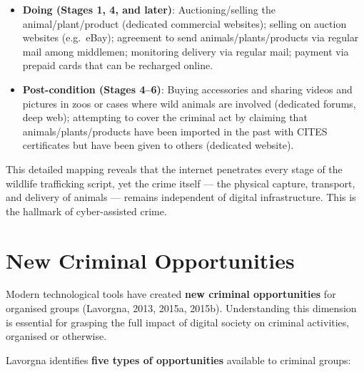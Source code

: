 \documentclass[11pt,a4paper,openany]{report}
\theoremstyle{definition}
\theoremstyle{plain}
\theoremstyle{remark}
\begin{document}
\begin{itemize}
    \item \textbf{Doing (Stages 1, 4, and later)}: Auctioning/selling the animal/plant/product (dedicated commercial websites); selling on auction websites (e.g.\ eBay); agreement to send animals/plants/products via regular mail among middlemen; monitoring delivery via regular mail; payment via prepaid cards that can be recharged online.
    \item \textbf{Post-condition (Stages 4--6)}: Buying accessories and sharing videos and pictures in zoos or cases where wild animals are involved (dedicated forums, deep web); attempting to cover the criminal act by claiming that animals/plants/products have been imported in the past with CITES certificates but have been given to others (dedicated website).
\end{itemize}

This detailed mapping reveals that the internet penetrates every stage of the wildlife trafficking script, yet the crime itself --- the physical capture, transport, and delivery of animals --- remains independent of digital infrastructure. This is the hallmark of cyber-assisted crime.


\section{New Criminal Opportunities}

Modern technological tools have created \textbf{new criminal opportunities} for organised groups (Lavorgna, 2013, 2015a, 2015b). Understanding this dimension is essential for grasping the full impact of digital society on criminal activities, organised or otherwise.

Lavorgna identifies \textbf{five types of opportunities} available to criminal groups:
\end{document}

